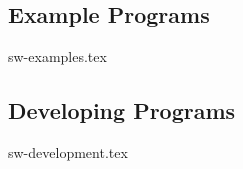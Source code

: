 \documentclass{scarv-report}
\begin{document}
\subsection{Example Programs}
{sw-examples.tex}

\subsection{Developing Programs}
{sw-development.tex}


\MKEPILOGUE

\end{document}
